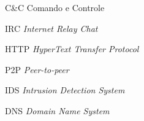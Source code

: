 \begin{siglas}
	\item[C\&C] Comando e Controle
	\item[IRC] \textit{Internet Relay Chat}
	\item[HTTP] \textit{HyperText Transfer Protocol}
	\item[P2P] \textit{Peer-to-peer}
	\item[IDS] \textit{Intrusion Detection System}
	\item[DNS] \textit{Domain Name System}
\end{siglas}